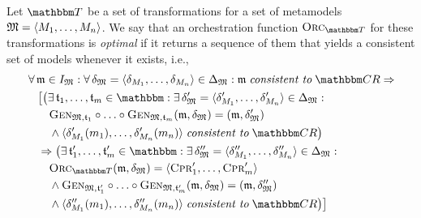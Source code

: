 \begin{definition}
    Let $\transformationset{T}$ be a set of transformations for a set of metamodels $\mathfrak{M} = \langle M_{1}, \dots, M_{n} \rangle$.
    We say that an orchestration function $\orcfunction{\transformationset{T}}$ for these transformations is \emph{optimal} if it returns a sequence of them that yields a consistent set of models whenever it exists, i.e.,
    \begin{align*}
        &
        \forall \modeltuple{m} \in \metamodeltupleinstanceset{M} : \forall \changetuple{\metamodeltuple{M}} = \tupled{\change{\metamodel{M}{1}}, \dots, \change{\metamodel{M}{n}}} \in \changeuniverse{\metamodeltuple{M}} :
        \modeltuple{m} \consistenttomath \consistencyrelationset{CR} \Rightarrow \\
        & \formulaskip
        \bigl[ \bigl(
            \exists \transformation{t}_{1}, \dots, \transformation{t}_{m} \in \transformationset{} : 
            \exists \changetuple{\metamodeltuple{M}}' = \tupled{\change{\metamodel{M}{1}}', \dots, \change{\metamodel{M}{n}}'} \in \changeuniverse{\metamodeltuple{M}} :\\
            & \formulaskip \formulaskip
            \generalizationfunction{\metamodeltuple{M}, \transformation{t}_{1}} \concatfunction \dots \concatfunction \generalizationfunction{\metamodeltuple{M}, \transformation{t}_{m}}(\modeltuple{m}, \changetuple{\metamodeltuple{M}}) = (\modeltuple{m}, \changetuple{\metamodeltuple{M}}')\\
            & \formulaskip \formulaskip
            \land \tupled{\change{\metamodel{M}{1}}'(\model{m}{1}), \dots, \change{\metamodel{M}{n}}'(\model{m}{n})} \consistenttomath \consistencyrelationset{CR} \bigr) \\
            & \formulaskip
            \Rightarrow \bigl(        
            \exists \transformation{t}_{1}', \dots, \transformation{t}_{m}' \in \transformationset{} : 
            \exists \changetuple{\metamodeltuple{M}}'' = \tupled{\change{\metamodel{M}{1}}'', \dots, \change{\metamodel{M}{n}}''} \in \changeuniverse{\metamodeltuple{M}} :\\
            & \formulaskip \formulaskip
            \orcfunction{\transformationset{T}}(\modeltuple{m}, \changetuple{\metamodeltuple{M}}) = \tupled{\consistencypreservationrule{1}', \dots, \consistencypreservationrule{m}'} \\
            & \formulaskip \formulaskip
            \land \generalizationfunction{\metamodeltuple{M},\transformation{t}_{1}'} \concatfunction \dots \concatfunction \generalizationfunction{\metamodeltuple{M},\transformation{t}_{m}'}(\modeltuple{m}, \changetuple{\metamodeltuple{M}}) = (\modeltuple{m}, \changetuple{\metamodeltuple{M}}'')\\
            & \formulaskip \formulaskip
            \land \tupled{\change{\metamodel{M}{1}}''(\model{m}{1}), \dots, \change{\metamodel{M}{n}}''(\model{m}{n})} \consistenttomath \consistencyrelationset{CR}
        \bigr) \bigr]
    \end{align*}
\end{definition}

